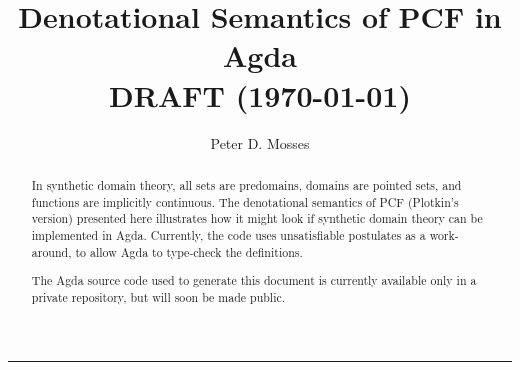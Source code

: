 \documentclass[a4paper]{easychair}
\title{Denotational Semantics of PCF in Agda \\[2ex]
\normalsize DRAFT (\today)}
\author{
Peter D. Mosses%
}
\institute{
  Delft University of Technology, The Netherlands
  \\
  \email{p.d.mosses@tudelft.nl}
\\
   Swansea University, United Kingdom
 }
\begin{document}
\maketitle

\begin{abstract}
In synthetic domain theory, all sets are predomains, domains are pointed sets, and functions are implicitly continuous.
The denotational semantics of PCF (Plotkin's version) presented here illustrates how it might look if synthetic domain theory can be implemented in Agda.
Currently, the code uses unsatisfiable postulates as a work-around, to allow Agda to type-check the definitions.

The Agda source code used to generate this document is currently available only in a private repository,
but will soon be made public.
\end{abstract}


\bigskip\hrule\bigskip



\clearpage

\clearpage

\clearpage

\clearpage

\clearpage

\clearpage

\clearpage



%
\end{document}
